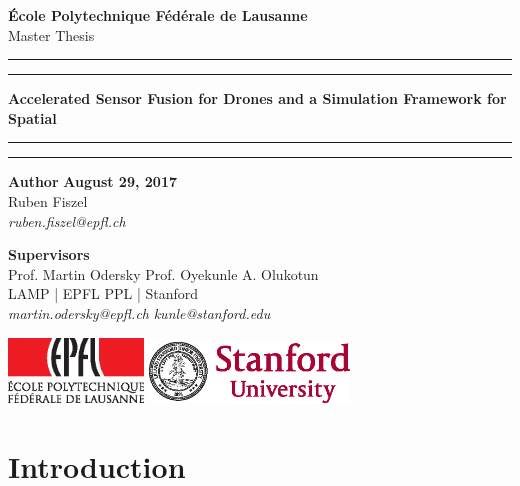 \documentclass[12pt,]{article}
\begin{document}

\begin{titlepage}
\begin{center}
\Large
\textbf{École Polytechnique Fédérale de Lausanne} \\
\vspace{1cm}
Master Thesis
\vspace{2cm}
\hrule
\vspace{0.1cm}
\hrule
\vspace{1cm}
\Huge
\textbf{Accelerated Sensor Fusion for Drones and a Simulation Framework for
Spatial}
\vspace{1cm}
\hrule
\vspace{0.1cm}
\hrule
\end{center}
\vfill
\noindent \textbf{Author} \hfill \textbf{August 29, 2017} \\
Ruben Fiszel \\
\textit{ruben.fiszel@epfl.ch} \\
\vspace{0.5cm}

\noindent \textbf{Supervisors} \\
Prof. Martin Odersky            \hfill    Prof. Oyekunle A. Olukotun \\
LAMP | EPFL                     \hfill    PPL | Stanford \\
\textit{martin.odersky@epfl.ch} \hfill    \textit{kunle@stanford.edu} \\
\vspace{0.8cm}

\noindent
\includegraphics[width=0.27\textwidth]{images/epfl-logo.eps}
\hfill
\includegraphics[width=0.4\textwidth]{images/stanford-logo.eps}

\end{titlepage}

\newpage
\null
\thispagestyle{empty}
\newpage



{
\setcounter{tocdepth}{3}
\tableofcontents
}
\section*{Introduction}\label{introduction}
\end{document}
